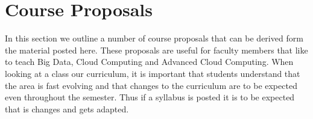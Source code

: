 \FILENAME

\chapter{Course Proposals}


In this section we outline a number of course proposals that can be
derived form the material posted here. These proposals are useful for
faculty members that like to teach Big Data, Cloud Computing and
Advanced Cloud Computing. When looking at a class our curriculum, it
is important that students understand that the area is fast evolving
and that changes to the curriculum are to be expected even throughout
the semester. Thus if a syllabus is posted it is to be expected that
is changes and gets adapted.
